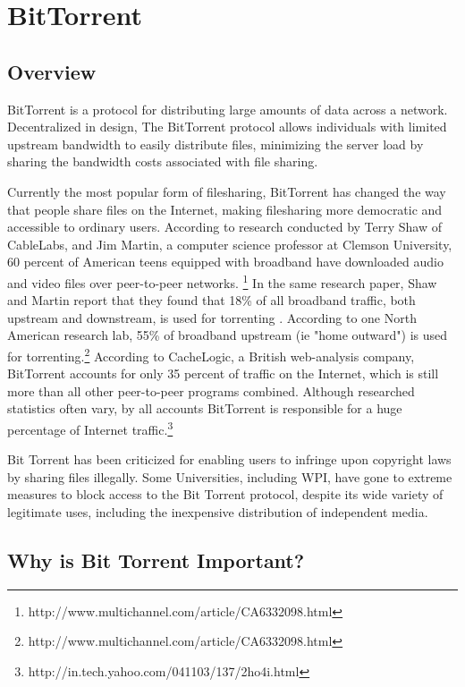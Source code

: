 \documentclass[a4paper,12pt]{report}
\begin{document}
\chapter{BitTorrent}

\section{Overview}
BitTorrent is a protocol for distributing large amounts of data across a network.
Decentralized in design, The BitTorrent protocol allows individuals with limited upstream bandwidth to easily distribute files, minimizing the server load by sharing the bandwidth costs associated with file sharing.


Currently the most popular form of filesharing, BitTorrent has changed the way that people share files on the Internet, making filesharing more democratic and accessible to ordinary users.
According to research conducted by Terry Shaw of CableLabs, and Jim Martin, a computer science professor at Clemson University, 60 percent of American teens equipped with broadband have downloaded audio and video files over peer-to-peer networks. \footnote { http://www.multichannel.com/article/CA6332098.html}
In the same research paper, Shaw and Martin report that they found that 18\% of all broadband traffic, both upstream and downstream, is used for torrenting .
According to one North American research lab, 55\% of broadband upstream (ie "home outward") is used for torrenting.\footnote{http://www.multichannel.com/article/CA6332098.html}
According to CacheLogic, a British web-analysis company, BitTorrent accounts for only 35 percent of traffic on the Internet, which is still more than all other peer-to-peer programs combined.  
Although researched statistics often vary, by all accounts BitTorrent is responsible for a huge percentage of Internet traffic.\footnote {http://in.tech.yahoo.com/041103/137/2ho4i.html}


Bit Torrent has been criticized for enabling users to infringe upon copyright laws by sharing files illegally. Some Universities, including WPI, have gone to extreme measures to block access to the Bit Torrent protocol, despite its wide variety of legitimate uses, including the inexpensive distribution of independent media.


\section{Why is Bit Torrent Important?}
\end{document}
